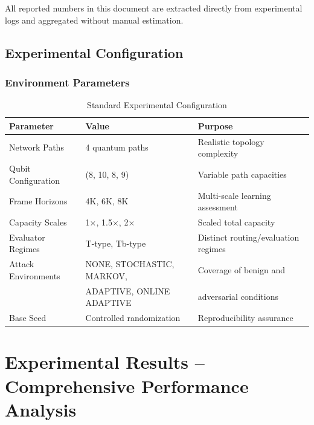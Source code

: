 \documentclass[12pt,a4paper]{article}
\begin{document}
All reported numbers in this document are extracted directly from experimental logs and aggregated without manual estimation.

\subsection{Experimental Configuration}

\subsubsection{Environment Parameters}

\begin{table}[H]
\centering
\caption{Standard Experimental Configuration}
\begin{tabular}{|l|l|l|}
\hline
\textbf{Parameter} & \textbf{Value} & \textbf{Purpose} \\
\hline
\hline
Network Paths & 4 quantum paths & Realistic topology complexity \\
Qubit Configuration & (8, 10, 8, 9) & Variable path capacities \\
Frame Horizons & 4K, 6K, 8K & Multi-scale learning assessment \\
Capacity Scales & 1$\times$, 1.5$\times$, 2$\times$ & Scaled total capacity \\
Evaluator Regimes & T-type, Tb-type & Distinct routing/evaluation regimes \\
Attack Environments & NONE, STOCHASTIC, MARKOV, & Coverage of benign and \\
 & ADAPTIVE, ONLINE ADAPTIVE & adversarial conditions \\
Base Seed & Controlled randomization & Reproducibility assurance \\
\hline
\end{tabular}
\end{table}

\newpage
\section{Experimental Results – Comprehensive Performance Analysis}
\end{document}

